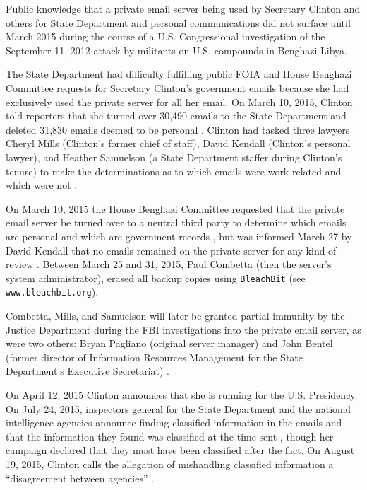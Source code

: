 \documentclass[journal]{vgtc}                %
\begin{document}
Public knowledge that a private email server being used by Secretary Clinton and others for State Department and personal communications did not surface until March 2015 \cite{NewYorkTimes2015} during the course of a U.S. Congressional investigation \cite{BenghaziReport} of the September 11, 2012 attack by militants on U.S. compounds in Benghazi Libya.  

The State Department had difficulty fulfilling public FOIA and House Benghazi Committee requests \cite{TakingRootWashPost} for Secretary Clinton's government emails because she had exclusively used the private server for all her email.  On March 10, 2015,  Clinton told reporters that she turned over 30,490 emails to the State Department and deleted 31,830 emails deemed to be personal \cite{WashPostTimeline}.    Clinton had tasked three lawyers Cheryl Mills (Clinton's former chief of staff),  David Kendall (Clinton's personal lawyer), and Heather Samuelson (a State Department staffer during Clinton's tenure) to make the determinations as to which emails were work related and which were not \cite{emailVetting, thompsonTimeline}.   

On March 10, 2015 the House Benghazi Committee requested that the private email server be turned over to a neutral third party to determine which emails are personal and which are government records \cite{serverRequest}, but was informed March 27 by David Kendall that no emails remained on the private server for any kind of review \cite{serverScrubbedLawyer}.
Between March 25 and 31, 2015, Paul Combetta (then the server's system administrator), erased all backup copies using \texttt{BleachBit} (see \texttt{www.bleachbit.org}).    

Combetta, Mills, and Samuelson will later be granted partial immunity by the Justice Department during the FBI investigations into the private email server, as were two others: Bryan Pagliano (original server manager) and  John Bentel (former director of Information Resources Management for the State Department's Executive Secretariat) \cite{immunityPolitico, immunityDailyCaller, immunityIT}.  

On April 12, 2015 Clinton announces that she is running for the U.S. Presidency.  On July 24, 2015, inspectors general for the State Department  and the national intelligence agencies announce finding classified information in the emails and that the information they found was classified at the time sent \cite{serverClassified}, though her campaign declared that they must have been classified after the fact. On August 19, 2015, Clinton calls the allegation of mishandling classified information a ``disagreement between agencies'' \cite{clintonDenialGuardian}.
\end{document}

